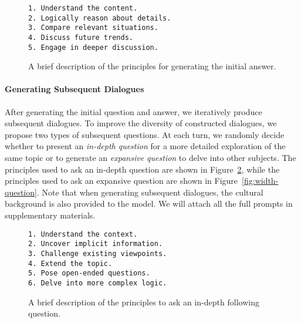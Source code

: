 \documentclass[11pt]{article}
\begin{document}
\begin{figure}[h]
\begin{tcolorbox}[colback=red!2,colframe=red!50!black]
\small
\texttt{1. Understand the content.\\
2. Logically reason about details.\\
3. Compare relevant situations.\\
4. Discuss future trends.\\
5. Engage in deeper discussion.}
\end{tcolorbox}
\caption{A brief description of the principles for generating the initial answer.}
\label{fig:first-answer}
\end{figure}

\paragraph{Generating Subsequent Dialogues}

After generating the initial question and answer, we iteratively produce subsequent dialogues. To improve the diversity of constructed dialogues, we propose two types of subsequent questions.
At each turn, we randomly decide whether to present an {\em in-depth question} for a more detailed exploration of the same topic or to generate an {\em expansive question} to delve into other subjects. The principles used to ask an in-depth question are shown in Figure~\ref{fig:depth-question}, while the principles used to ask an expansive question are shown in Figure~\ref{fig:width-question}. Note that when generating subsequent dialogues, the cultural background is also provided to the model. We will attach all the full prompts in supplementary materials.

\begin{figure}[ht]
\begin{tcolorbox}[colback=red!2,colframe=red!50!black]
\small
\texttt{1. Understand the context.\\
2. Uncover implicit information.\\
3. Challenge existing viewpoints.\\
4. Extend the topic.\\
5. Pose open-ended questions.\\
6. Delve into more complex logic.}
\end{tcolorbox}
\caption{A brief description of the principles to ask an in-depth following question.}
\label{fig:depth-question}
\end{figure}
\end{document}

